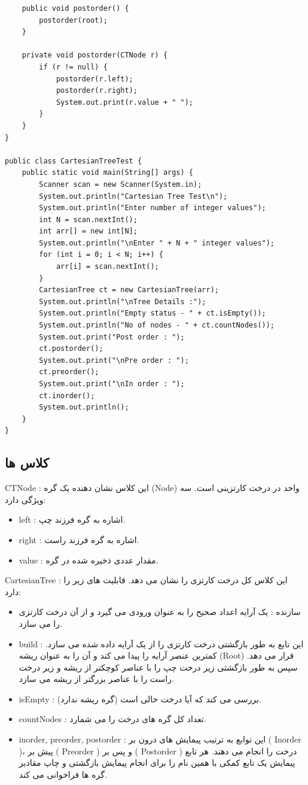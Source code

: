 \documentclass{article}
\begin{document}
\begin{latin}
\begin{verbatim}
    public void postorder() {
        postorder(root);
    }

    private void postorder(CTNode r) {
        if (r != null) {
            postorder(r.left);
            postorder(r.right);
            System.out.print(r.value + " ");
        }
    }
}

public class CartesianTreeTest {
    public static void main(String[] args) {
        Scanner scan = new Scanner(System.in);
        System.out.println("Cartesian Tree Test\n");
        System.out.println("Enter number of integer values");
        int N = scan.nextInt();
        int arr[] = new int[N];
        System.out.println("\nEnter " + N + " integer values");
        for (int i = 0; i < N; i++) {
            arr[i] = scan.nextInt();
        }
        CartesianTree ct = new CartesianTree(arr);
        System.out.println("\nTree Details :");
        System.out.println("Empty status - " + ct.isEmpty());
        System.out.println("No of nodes - " + ct.countNodes());
        System.out.print("Post order : ");
        ct.postorder();
        System.out.print("\nPre order : ");
        ct.preorder();
        System.out.print("\nIn order : ");
        ct.inorder();
        System.out.println();
    }
}  
\end{verbatim}
\end{latin}
\subsection{کلاس ها}
CTNode : این کلاس نشان دهنده یک گره (Node) واحد در درخت کارتزینی است. سه ویژگی دارد:
\begin{itemize}
    \item left : اشاره به گره فرزند چپ.
    \item right : اشاره به گره فرزند راست.
    \item value : مقدار عددی ذخیره شده در گره.
\end{itemize}
CartesianTree : این کلاس کل درخت کارتزی را نشان می دهد. قابلیت های زیر را دارد:
\begin{itemize}
    \item سازنده : یک آرایه اعداد صحیح را به عنوان ورودی می گیرد و از آن درخت کارتزی را می سازد.
    \item build : این تابع به طور بازگشتی درخت کارتزی را از یک آرایه داده شده می سازد. کمترین عنصر آرایه را پیدا می کند و آن را به عنوان ریشه (Root) قرار می دهد. سپس به طور بازگشتی زیر درخت چپ را با عناصر کوچکتر از ریشه و زیر درخت راست را با عناصر بزرگتر از ریشه می سازد.
    \item isEmpty : بررسی می کند که آیا درخت خالی است (گره ریشه ندارد).
    \item countNodes :  تعداد کل گره های درخت را می شمارد.
    \item inorder, preorder, postorder : این توابع به ترتیب پیمایش های درون بر ( Inorder )، پیش بر ( Preorder ) و پس بر ( Postorder ) درخت را انجام می دهند. هر تابع پیمایش یک تابع کمکی با همین نام را برای انجام پیمایش بازگشتی و چاپ مقادیر گره ها فراخوانی می کند.
\end{itemize}
\end{document}
